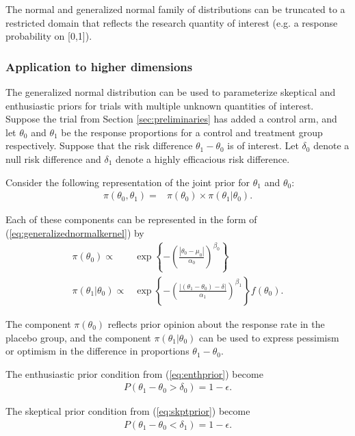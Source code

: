 \documentclass[12pt]{article}
\begin{document}
The normal and generalized normal family of distributions can be truncated to a restricted domain that reflects the research quantity of interest (e.g. a response probability on [0,1]).
\subsubsection{Application to higher dimensions}
The generalized normal distribution can be used to parameterize skeptical and enthusiastic priors for trials with multiple unknown quantities of interest. Suppose the trial from Section \ref{sec:preliminaries} has added a control arm, and let $\theta_0$ and $\theta_1$ be the response proportions for a control and treatment group respectively. Suppose that the risk difference $\theta_1-\theta_0$ is of interest. Let $\delta_0$ denote a null risk difference and $\delta_1$ denote a highly efficacious risk difference.

Consider the following representation of the joint prior for $\theta_1$ and $\theta_0$:
\begin{align}
\pi(\theta_0,\theta_1)=&\pi(\theta_0)\times\pi(\theta_1|\theta_0). \label{eq:generalized_normal_joint}
\end{align}

Each of these components can be represented in the form of (\ref{eq:generalizednormalkernel}) by
\begin{align}
\pi(\theta_0)\propto&\exp\left\{-\left(\frac{|\theta_0-\mu_0|}{\alpha_0}\right)^{\beta_0}\right\} \label{eq:genNormPlacebo}\\
\pi(\theta_1|\theta_0)\propto&\exp\left\{-\left(\frac{|(\theta_1-\theta_0)-\delta|}{\alpha_1}\right)^{\beta_1}\right\}f(\theta_0). \label{eq:genNormRd}
\end{align}

The component $\pi(\theta_0)$ reflects prior opinion about the response rate in the placebo group, and the component $\pi(\theta_1|\theta_0)$ can be used to express pessimism or optimism in the difference in proportions $\theta_1 - \theta_0$. 

The enthusiastic prior condition from (\ref{eq:enthprior}) become
\begin{align}\label{eq:ex2enthcondition}
P(\theta_1-\theta_0>\delta_0)=1-\epsilon.
\end{align}

The skeptical prior condition from (\ref{eq:skptprior}) become
\begin{align}\label{eq:ex2skptcondition}
P(\theta_1-\theta_0<\delta_1)=1-\epsilon.
\end{align}
\end{document}
